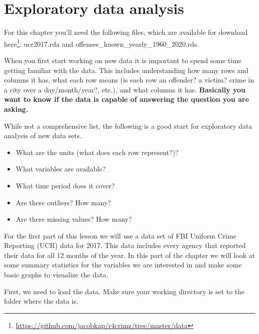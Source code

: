 \documentclass[
]{krantz}
\makeatletter
\newenvironment{Shaded}{\begin{snugshade}}{\end{snugshade}}
\newcommand{\CommentTok}[1]{\textcolor[rgb]{0.37,0.37,0.37}{\textit{#1}}}
\newcommand{\FunctionTok}[1]{\textcolor[rgb]{0,0,0}{#1}}
\newcommand{\NormalTok}[1]{#1}
\newcommand{\SpecialCharTok}[1]{\textcolor[rgb]{0,0,0}{#1}}
\providecommand{\tightlist}{%
  \setlength{\itemsep}{0pt}\setlength{\parskip}{0pt}}
\renewcommand{\href}[2]{#2\footnote{\url{#1}}}
\newenvironment{kframe}{%
\medskip{}
\setlength{\fboxsep}{.8em}
 \def\at@end@of@kframe{}%
 \ifinner\ifhmode%
  \def\at@end@of@kframe{\end{minipage}}%
  \begin{minipage}{\columnwidth}%
 \fi\fi%
 \def\FrameCommand##1{\hskip\@totalleftmargin \hskip-\fboxsep
 \colorbox{shadecolor}{##1}\hskip-\fboxsep
     \hskip-\linewidth \hskip-\@totalleftmargin \hskip\columnwidth}%
 \MakeFramed {\advance\hsize-\width
   \@totalleftmargin\z@ \linewidth\hsize
   \@setminipage}}%
 {\par\unskip\endMakeFramed%
 \at@end@of@kframe}
\renewenvironment{Shaded}{\begin{kframe}}{\end{kframe}}
\makeatother
\begin{document}
\begin{Shaded}
\end{Shaded}

\hypertarget{explore}{%
\chapter{Exploratory data analysis}\label{explore}}

For this chapter you'll need the following files, which are
available for download
\href{https://github.com/jacobkap/r4crimz/tree/master/data}{here}:
ucr2017.rda and offenses\_known\_yearly\_1960\_2020.rds.

When you first start working on new data it is important to
spend some time getting familiar with the data. This
includes understanding how many rows and columns it has,
what each row means (is each row an offender? a victim?
crime in a city over a day/month/year?, etc.), and what
columns it has. \textbf{Basically you want to know if the
data is capable of answering the question you are asking.}

While not a comprehensive list, the following is a good
start for exploratory data analysis of new data sets.

\begin{itemize}
\tightlist
\item
  What are the units (what does each row represent?)?
\item
  What variables are available?
\item
  What time period does it cover?
\item
  Are there outliers? How many?
\item
  Are there missing values? How many?
\end{itemize}

For the first part of this lesson we will use a data set of
FBI Uniform Crime Reporting (UCR) data for 2017. This data
includes every agency that reported their data for all 12
months of the year. In this part of the chapter we will look
at some summary statistics for the variables we are
interested in and make some basic graphs to visualize the
data.

First, we need to load the data. Make sure your working
directory is set to the folder where the data is.
\end{document}
